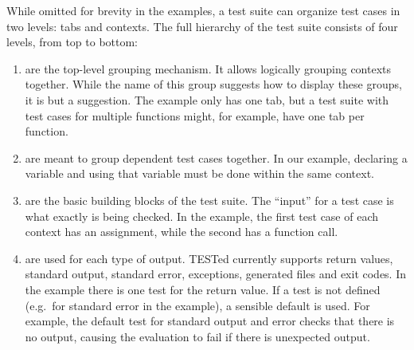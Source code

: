 \documentclass[../main]{subfiles}
\begin{document}
While omitted for brevity in the examples, a test suite can organize test cases in two levels: tabs and contexts.
The full hierarchy of the test suite consists of four levels, from top to bottom:

\begin{enumerate}[noitemsep]
    \item {} are the top-level grouping mechanism.
          It allows logically grouping contexts together.
          While the name of this group suggests how to display these groups, it is but a suggestion.
          The example only has one tab, but a test suite with test cases for multiple functions might, for example, have one tab per function.
    \item {} are meant to group dependent test cases together.
          In our example, declaring a variable and using that variable must be done within the same context.
    \item {} are the basic building blocks of the test suite.
          The ``input'' for a test case is what exactly is being checked.
          In the example, the first test case of each context has an assignment, while the second has a function call.
    \item {} are used for each type of output.
          TESTed currently supports return values, standard output, standard error, exceptions, generated files and exit codes.
          In the example there is one test for the return value.
          If a test is not defined (e.g.\ for standard error in the example), a sensible default is used.
          For example, the default test for standard output and error checks that there is no output, causing the evaluation to fail if there is unexpected output.
\end{enumerate}
\end{document}
